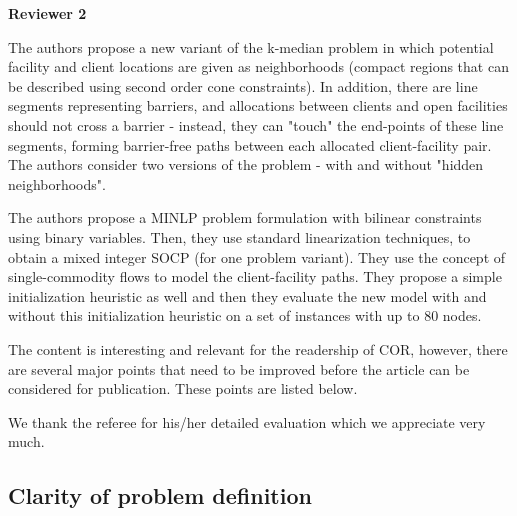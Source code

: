 \documentclass{article}
\newenvironment{reviewer}{\setcounter{pointcounter}{1}}{}
\newcommand{\point}{\text{{\selectfont \thepointcounter} \stepcounter{pointcounter}}}
\begin{document}
	\newpage
	\begin{reviewer}
		
		\begin{tcolorbox}[breakable,enhanced,coltitle=black,colback=green!75!black,colframe=green!75!black,borderline={1pt}{0pt}{black},boxrule=0pt]
			\textbf{Reviewer 2}
		\end{tcolorbox}
		
		\begin{itshape}
			The authors propose a new variant of the k-median problem in which potential facility and client locations are given as neighborhoods (compact regions that can be described using second order cone constraints). In addition, there are line segments representing barriers, and allocations between clients and open facilities should not cross a barrier - instead, they can "touch" the end-points of these line segments, forming barrier-free paths between each allocated client-facility pair. The authors consider two versions of the problem - with and without "hidden neighborhoods".
			
			The authors propose a MINLP problem formulation with bilinear constraints using binary variables. Then, they use standard linearization techniques, to obtain a mixed integer SOCP (for one problem variant). They use the concept of single-commodity flows to model the client-facility paths. They propose a simple initialization heuristic as well and then they evaluate the new model with and without this initialization heuristic on a set of instances with up to 80 nodes.
			
			The content is interesting and relevant for the readership of COR, however, there are several major points that need to be improved before the article can be considered for publication. These points are listed below.

		\end{itshape}
		
		\begin{tcolorbox}[breakable,enhanced,coltitle=black,colback=green!5!white,colframe=green!75!black,title=\textbf{Answer R2.\point},borderline={1pt}{0pt}{black},boxrule=0pt]
		We thank the referee for his/her detailed evaluation which we appreciate very much.
			
		\end{tcolorbox}
		
		\subsection*{Clarity of problem definition}
				

\end{reviewer}
\end{document}

